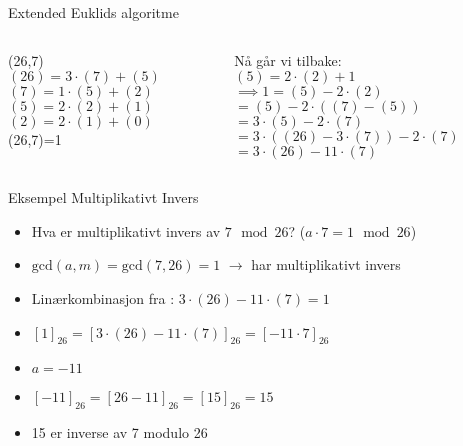 \begin{frame}{Extended Euklids algoritme}
    \begin{columns}
        \begin{column}{0.45\textwidth}
             (26,7)\\
             
             $(26)=3\cdot (7)+(5)$\\
             $(7)=1\cdot (5)+(2)$\\
             $(5)=2\cdot(2)+(1)$\\
             $(2)=2\cdot(1)+(0)$\\
             
             (26,7)=1
        \end{column}
        \pause
        \begin{column}{0.45\textwidth}
            Nå går vi tilbake:\\
            $(5)=2\cdot(2)+1$\\
            
            $\implies 1=(5)-2\cdot (2)$\\
            $=(5)-2\cdot ((7)-(5))$\\
            $=3\cdot (5)-2\cdot(7)$\\
            $=3\cdot ((26)-3\cdot (7))-2\cdot (7)$\\
            $=3\cdot (26)-11\cdot (7)$
        \end{column}
    \end{columns}
\end{frame}


\begin{frame}{Eksempel Multiplikativt Invers}
\begin{itemize}[<+->]
\item Hva er multiplikativt invers av $7\, \bmod 26$? ($a\cdot 7=1\, \bmod 26$)
\item $\text{gcd}(a,m) = \text{gcd}(7,26)=1$ $\rightarrow$ har multiplikativt invers
\item Linærkombinasjon fra : $3\cdot (26)-11\cdot (7)=1$
\item $[1]_{26}=[3\cdot (26)-11\cdot (7)]_{26}=[-11\cdot 7]_{26}$
\item $a=-11$
\item $[-11]_{26}=[26-11]_{26}=[15]_{26}=15$
\item 15 er inverse av 7 modulo 26

\end{itemize}
\end{frame}